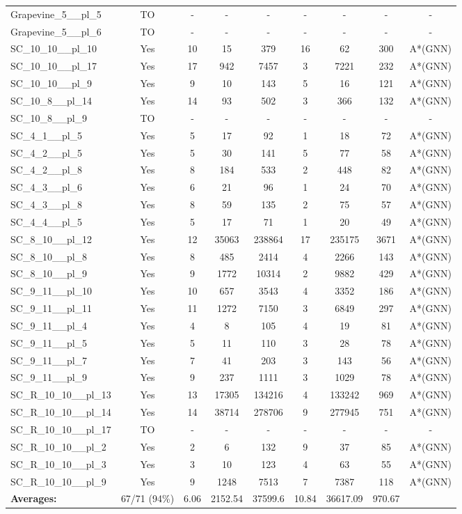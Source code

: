 \documentclass{article}
\begin{document}
\begin{tabular}{lcccccccc}
Grapevine\_5\_\_pl\_5 & TO & - & - & - & - & - & - & - \\
Grapevine\_5\_\_pl\_6 & TO & - & - & - & - & - & - & - \\
SC\_10\_10\_\_pl\_10 & Yes & 10 & 15 & 379 & 16 & 62 & 300 & A*(GNN) \\
SC\_10\_10\_\_pl\_17 & Yes & 17 & 942 & 7457 & 3 & 7221 & 232 & A*(GNN) \\
SC\_10\_10\_\_pl\_9 & Yes & 9 & 10 & 143 & 5 & 16 & 121 & A*(GNN) \\
SC\_10\_8\_\_pl\_14 & Yes & 14 & 93 & 502 & 3 & 366 & 132 & A*(GNN) \\
SC\_10\_8\_\_pl\_9 & TO & - & - & - & - & - & - & - \\
SC\_4\_1\_\_pl\_5 & Yes & 5 & 17 & 92 & 1 & 18 & 72 & A*(GNN) \\
SC\_4\_2\_\_pl\_5 & Yes & 5 & 30 & 141 & 5 & 77 & 58 & A*(GNN) \\
SC\_4\_2\_\_pl\_8 & Yes & 8 & 184 & 533 & 2 & 448 & 82 & A*(GNN) \\
SC\_4\_3\_\_pl\_6 & Yes & 6 & 21 & 96 & 1 & 24 & 70 & A*(GNN) \\
SC\_4\_3\_\_pl\_8 & Yes & 8 & 59 & 135 & 2 & 75 & 57 & A*(GNN) \\
SC\_4\_4\_\_pl\_5 & Yes & 5 & 17 & 71 & 1 & 20 & 49 & A*(GNN) \\
SC\_8\_10\_\_pl\_12 & Yes & 12 & 35063 & 238864 & 17 & 235175 & 3671 & A*(GNN) \\
SC\_8\_10\_\_pl\_8 & Yes & 8 & 485 & 2414 & 4 & 2266 & 143 & A*(GNN) \\
SC\_8\_10\_\_pl\_9 & Yes & 9 & 1772 & 10314 & 2 & 9882 & 429 & A*(GNN) \\
SC\_9\_11\_\_pl\_10 & Yes & 10 & 657 & 3543 & 4 & 3352 & 186 & A*(GNN) \\
SC\_9\_11\_\_pl\_11 & Yes & 11 & 1272 & 7150 & 3 & 6849 & 297 & A*(GNN) \\
SC\_9\_11\_\_pl\_4 & Yes & 4 & 8 & 105 & 4 & 19 & 81 & A*(GNN) \\
SC\_9\_11\_\_pl\_5 & Yes & 5 & 11 & 110 & 3 & 28 & 78 & A*(GNN) \\
SC\_9\_11\_\_pl\_7 & Yes & 7 & 41 & 203 & 3 & 143 & 56 & A*(GNN) \\
SC\_9\_11\_\_pl\_9 & Yes & 9 & 237 & 1111 & 3 & 1029 & 78 & A*(GNN) \\
SC\_R\_10\_10\_\_pl\_13 & Yes & 13 & 17305 & 134216 & 4 & 133242 & 969 & A*(GNN) \\
SC\_R\_10\_10\_\_pl\_14 & Yes & 14 & 38714 & 278706 & 9 & 277945 & 751 & A*(GNN) \\
SC\_R\_10\_10\_\_pl\_17 & TO & - & - & - & - & - & - & - \\
SC\_R\_10\_10\_\_pl\_2 & Yes & 2 & 6 & 132 & 9 & 37 & 85 & A*(GNN) \\
SC\_R\_10\_10\_\_pl\_3 & Yes & 3 & 10 & 123 & 4 & 63 & 55 & A*(GNN) \\
SC\_R\_10\_10\_\_pl\_9 & Yes & 9 & 1248 & 7513 & 7 & 7387 & 118 & A*(GNN) \\
\textbf{Averages:} & 67/71 (94\%) & 6.06 & 2152.54 & 37599.6 & 10.84 & 36617.09 & 970.67 & \\
\bottomrule
\end{tabular}
\\[0.7cm]
\end{document}
